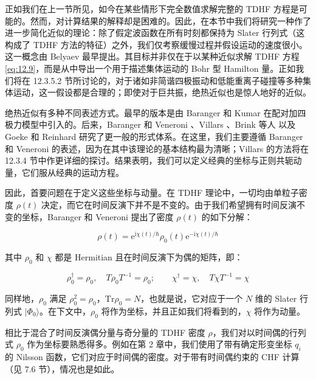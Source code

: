 正如我们在上一节所见，如今在某些情形下完全数值求解完整的 TDHF 方程是可能的。然而，对计算结果的解释却是困难的。因此，在本节中我们将研究一种作了进一步简化近似的理论：除了假定波函数在所有时刻都保持为
Slater 行列式（这构成了 TDHF 方法的特征）之外，我们仅考察缓慢过程并假设运动的速度很小。这一概念由 Belyaev \cite{Be65}
最早提出。其目标并非仅在于以某种近似求解 TDHF 方程 \ref{eq:12.9}，而是从中导出一个用于描述集体运动的 Bohr
型 Hamilton 量。正如我们将在 12.3.5.2 节所讨论的，对于诸如非简谐四极振动和低能重离子碰撞等多种集体运动，这一假设都是合理的；即使对于巨共振，绝热近似也是惊人地好的近似。

绝热近似有多种不同表述方式。最早的版本是由 Baranger 和 Kumar \cite{BK68} 在配对加四极力模型中引入的。后来，Baranger
和 Veneroni \cite{BV78}、Villars \cite{Vi75,Vi77}、Brink 等人 \cite{BEG76}
以及 Goeke 和 Reinhard \cite{GR78,RG78} 研究了更一般的形式体系。在这里，我们主要遵循 Baranger
和 Veneroni \cite{BV78} 的表述，因为在其中该理论的基本结构最为清晰；Villars 的方法将在 12.3.4
节中作更详细的探讨。结果表明，我们可以定义经典的坐标与正则共轭动量，它们服从经典的运动方程。

因此，首要问题在于定义这些坐标与动量。在 TDHF 理论中，一切均由单粒子密度 $\rho(t)$ 决定，而它在时间反演下并不是不变的。由于我们希望拥有时间反演不变的坐标，Baranger
和 Veneroni 提出了密度 $\rho(t)$ 的如下分解：

\begin{equation}
\rho(t)=\mathrm{e}^{\mathrm{i}\chi(t)/\hbar}\rho_{0}(t)\mathrm{e}^{-\mathrm{i}\chi(t)/\hbar}\label{eq:12.63}
\end{equation}

其中 $\rho_{0}$ 和 $\chi$ 都是 Hermitian 且在时间反演下为偶的矩阵，即：

\begin{equation}
\rho^{\dagger}_{0}=\rho_{0},\quad T\rho_{0}T^{-1}=\rho_{0};\qquad\chi^{\dagger}=\chi,\quad T\chi T^{-1}=\chi\label{eq:12.64}
\end{equation}

同样地，$\rho_{0}$ 满足 $\rho^{2}_{0}=\rho_{0}$，$\mathrm{Tr}\rho_{0}=N$，也就是说，它对应于一个
$N$ 维的 Slater 行列式 $|\Phi_{0}\rangle$。在下文中，$\rho_{0}$ 将作为坐标，并且正如我们将看到的，$\chi$
将作为动量。

相比于混合了时间反演偶分量与奇分量的 TDHF 密度 $\rho$，我们对以时间偶的行列式 $\rho_{0}$ 作为坐标要熟悉得多。例如在第
2 章中，我们使用了带有确定形变坐标 $q_{i}$ 的 Nilsson 函数，它们对应于时间偶的密度。对于带有时间偶约束的 CHF
计算（见 7.6 节），情况也是如此。

